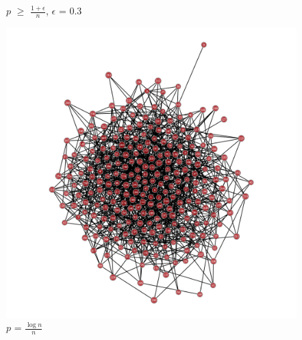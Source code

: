 \documentclass{article}
\begin{document}
\begin{figure}[!htb]
  \caption*{$p$ $\geq$ $\frac{1+\epsilon}{n}$,  $\epsilon$ = 0.3}
\endminipage\hfill
{}%
  \includegraphics[width=\linewidth]{ER_Examples/ER_DN.png}
  \caption*{$p$ = $\frac{\log{}n}{n}$}
\endminipage
\end{figure}
\end{document}
